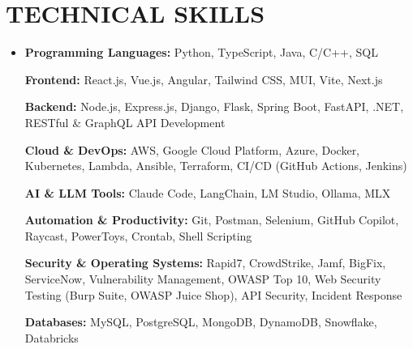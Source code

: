 \documentclass[letterpaper,10pt]{article}
\newcommand{\resumeSubHeadingListStart}{\begin{itemize}[leftmargin=0in,label={}]}
\newcommand{\resumeSubHeadingListEnd}{\end{itemize}}
\begin{document}
\section{TECHNICAL SKILLS}
\vspace{6pt}
\resumeSubHeadingListStart
\item \small{

\textbf{Programming Languages:} Python, TypeScript, Java, C/C++, SQL

\vspace{3pt}

\textbf{Frontend:} React.js, Vue.js, Angular, Tailwind CSS, MUI, Vite, Next.js

\vspace{3pt}

\textbf{Backend:} Node.js, Express.js, Django, Flask, Spring Boot, FastAPI, .NET, RESTful \& GraphQL API Development

\vspace{3pt}

\textbf{Cloud \& DevOps:} AWS, Google Cloud Platform, Azure, Docker, Kubernetes, Lambda, Ansible, Terraform, CI/CD (GitHub Actions, Jenkins)

\vspace{3pt}

\textbf{AI \& LLM Tools:} Claude Code, LangChain, LM Studio, Ollama, MLX

\vspace{3pt}

\textbf{Automation \& Productivity:} Git, Postman, Selenium, GitHub Copilot, Raycast, PowerToys, Crontab, Shell Scripting

\vspace{3pt}

\textbf{Security \& Operating Systems:} Rapid7, CrowdStrike, Jamf, BigFix, ServiceNow, Vulnerability Management, OWASP Top 10, Web Security Testing (Burp Suite, OWASP Juice Shop), API Security, Incident Response

\vspace{3pt}

\textbf{Databases:} MySQL, PostgreSQL, MongoDB, DynamoDB, Snowflake, Databricks

}
\resumeSubHeadingListEnd
\end{document}
